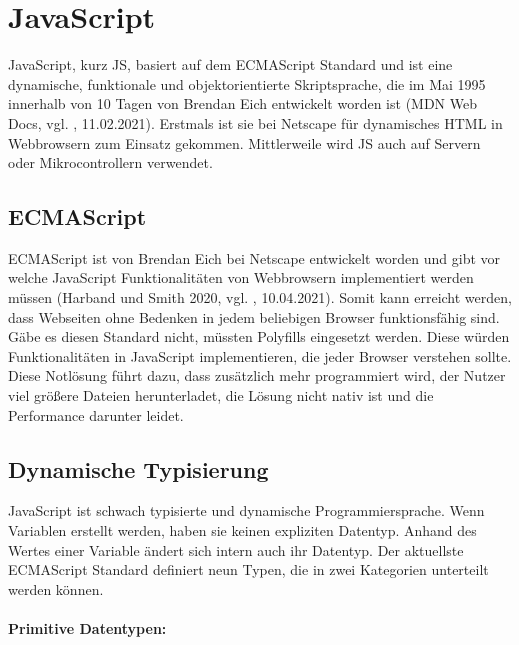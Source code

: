 \newpage
\section{JavaScript}
JavaScript, kurz JS, basiert auf dem ECMAScript Standard und ist eine dynamische, funktionale und objektorientierte Skriptsprache, die im Mai 1995 innerhalb von 10 Tagen von Brendan Eich entwickelt worden ist (MDN Web Docs, vgl. \cite{javascript_2021}, 11.02.2021). Erstmals ist sie bei Netscape für dynamisches HTML in Webbrowsern zum Einsatz gekommen. Mittlerweile wird JS auch auf Servern oder Mikrocontrollern verwendet.

\subsection{ECMAScript}
ECMAScript ist von Brendan Eich bei Netscape entwickelt worden und gibt vor welche JavaScript Funktionalitäten von Webbrowsern implementiert werden müssen (Harband und Smith 2020, vgl. \cite{ecma_2020}, 10.04.2021). Somit kann erreicht werden, dass Webseiten ohne Bedenken in jedem beliebigen Browser funktionsfähig sind. Gäbe es diesen Standard nicht, müssten Polyfills eingesetzt werden. Diese würden Funktionalitäten in JavaScript implementieren, die jeder Browser verstehen sollte. Diese Notlösung führt dazu, dass zusätzlich mehr programmiert wird, der Nutzer viel größere Dateien herunterladet, die Lösung nicht nativ ist und die Performance darunter leidet. 

\subsection{Dynamische Typisierung}
JavaScript ist schwach typisierte und dynamische Programmiersprache. Wenn Variablen erstellt werden, haben sie keinen expliziten Datentyp. Anhand des Wertes einer Variable ändert sich intern auch ihr Datentyp. Der aktuellste ECMAScript Standard definiert neun Typen, die in zwei Kategorien unterteilt werden können.

\paragraph{Primitive Datentypen:}

